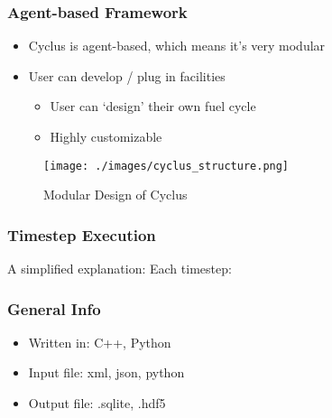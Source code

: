 \begin{frame}
	\frametitle{Agent-based Framework}
	\begin{itemize}
		\item Cyclus is agent-based, which means it's very modular
		\item User can develop / plug in facilities
			\begin{itemize}
				\item User can `design' their own fuel cycle
				\item Highly customizable
			\end{itemize}
	\end{itemize}
	\begin{figure}[htbp!]
        \begin{center}
                \texttt{[image: ./images/cyclus\_structure.png]}
        \end{center}
        \caption{Modular Design of Cyclus \cite{original}}
        \label{fig:cyclus_struc}

	\end{figure}
\end{frame}

\begin{frame}
    \frametitle{Timestep Execution}
    A simplified explanation: Each timestep:
    
\begin{figure}[H]
\centering
{}
\end{figure}

\end{frame}

\begin{frame}
	\frametitle{General Info}
	\begin{itemize}
		\item Written in: C++, Python
		\item Input file: xml, json, python
		\item Output file: .sqlite, .hdf5
	\end{itemize}
\end{frame}



